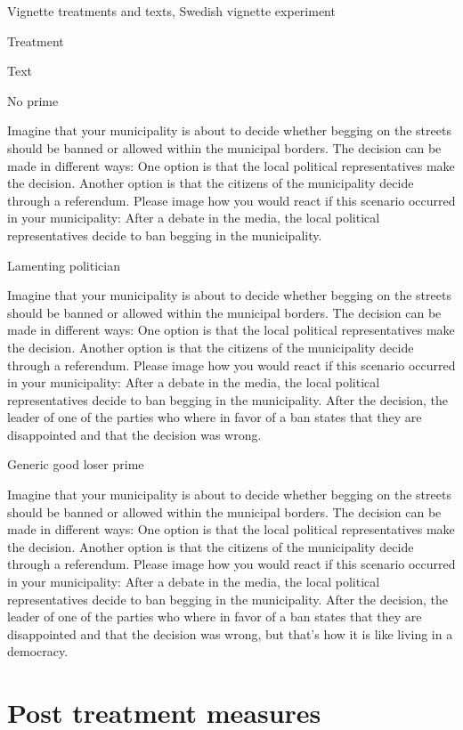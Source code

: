 \documentclass[
]{book}
\begin{document}
Vignette treatments and texts, Swedish vignette experiment

Treatment

Text

No prime

Imagine that your municipality is about to decide whether begging on the
streets should be banned or allowed within the municipal borders. The
decision can be made in different ways: One option is that the local
political representatives make the decision. Another option is that the
citizens of the municipality decide through a referendum. Please image
how you would react if this scenario occurred in your municipality:
After a debate in the media, the local political representatives decide
to ban begging in the municipality.

Lamenting politician

Imagine that your municipality is about to decide whether begging on the
streets should be banned or allowed within the municipal borders. The
decision can be made in different ways: One option is that the local
political representatives make the decision. Another option is that the
citizens of the municipality decide through a referendum. Please image
how you would react if this scenario occurred in your municipality:
After a debate in the media, the local political representatives decide
to ban begging in the municipality. After the decision, the leader of
one of the parties who where in favor of a ban states that they are
disappointed and that the decision was wrong.

Generic good loser prime

Imagine that your municipality is about to decide whether begging on the
streets should be banned or allowed within the municipal borders. The
decision can be made in different ways: One option is that the local
political representatives make the decision. Another option is that the
citizens of the municipality decide through a referendum. Please image
how you would react if this scenario occurred in your municipality:
After a debate in the media, the local political representatives decide
to ban begging in the municipality. After the decision, the leader of
one of the parties who where in favor of a ban states that they are
disappointed and that the decision was wrong, but that's how it is like
living in a democracy.

\hypertarget{post-treatment-measures}{%
\section{Post treatment measures}\label{post-treatment-measures}}
\end{document}
